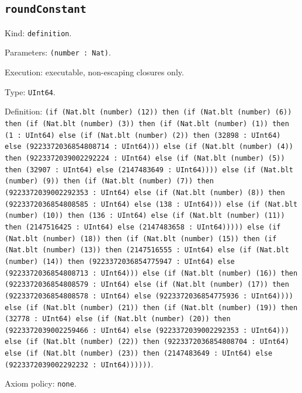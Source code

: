 \documentclass[11pt]{article}
\begin{document}
\subsection*{\texttt{roundConstant}}
\noindent Kind: \texttt{definition}.\par
\noindent Parameters: \texttt{(number : Nat)}.\par
\noindent Execution: executable, non-escaping closures only.\par
\noindent Type: \texttt{UInt64}.\par
\noindent Definition: \texttt{(if (Nat.blt (number) (12)) then (if (Nat.blt (number) (6)) then (if (Nat.blt (number) (3)) then (if (Nat.blt (number) (1)) then (1 : UInt64) else (if (Nat.blt (number) (2)) then (32898 : UInt64) else (9223372036854808714 : UInt64))) else (if (Nat.blt (number) (4)) then (9223372039002292224 : UInt64) else (if (Nat.blt (number) (5)) then (32907 : UInt64) else (2147483649 : UInt64)))) else (if (Nat.blt (number) (9)) then (if (Nat.blt (number) (7)) then (9223372039002292353 : UInt64) else (if (Nat.blt (number) (8)) then (9223372036854808585 : UInt64) else (138 : UInt64))) else (if (Nat.blt (number) (10)) then (136 : UInt64) else (if (Nat.blt (number) (11)) then (2147516425 : UInt64) else (2147483658 : UInt64))))) else (if (Nat.blt (number) (18)) then (if (Nat.blt (number) (15)) then (if (Nat.blt (number) (13)) then (2147516555 : UInt64) else (if (Nat.blt (number) (14)) then (9223372036854775947 : UInt64) else (9223372036854808713 : UInt64))) else (if (Nat.blt (number) (16)) then (9223372036854808579 : UInt64) else (if (Nat.blt (number) (17)) then (9223372036854808578 : UInt64) else (9223372036854775936 : UInt64)))) else (if (Nat.blt (number) (21)) then (if (Nat.blt (number) (19)) then (32778 : UInt64) else (if (Nat.blt (number) (20)) then (9223372039002259466 : UInt64) else (9223372039002292353 : UInt64))) else (if (Nat.blt (number) (22)) then (9223372036854808704 : UInt64) else (if (Nat.blt (number) (23)) then (2147483649 : UInt64) else (9223372039002292232 : UInt64))))))}.\par
\noindent Axiom policy: \texttt{none}.\par
\end{document}
